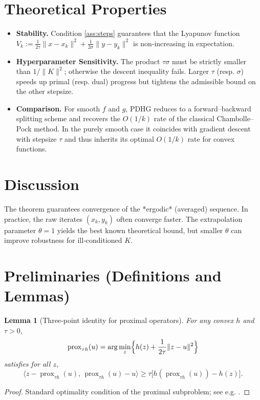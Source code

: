 \documentclass{article}
\newtheorem{lemma}{Lemma}
\begin{document}
\section*{Theoretical Properties}
\begin{itemize}
  \item \textbf{Stability.} Condition \eqref{ass:steps} guarantees that the Lyapunov function  
  $V_{k}:=\frac{1}{2\tau}\|x-x_{k}\|^{2}+\frac{1}{2\sigma}\|y-y_{k}\|^{2}$  
  is non‑increasing in expectation.
  \item \textbf{Hyperparameter Sensitivity.} The product $\tau\sigma$ must be strictly smaller than $1/\|K\|^{2}$; otherwise the descent inequality fails. Larger $\tau$ (resp. $\sigma$) speeds up primal (resp. dual) progress but tightens the admissible bound on the other stepsize.
  \item \textbf{Comparison.} For smooth $f$ and $g$, PDHG reduces to a forward–backward splitting scheme and recovers the $O(1/k)$ rate of the classical Chambolle–Pock method. In the purely smooth case it coincides with gradient descent with stepsize $\tau$ and thus inherits its optimal $O(1/k)$ rate for convex functions.
\end{itemize}

\section*{Discussion}
The theorem guarantees convergence of the *ergodic* (averaged) sequence. In practice, the raw iterates $(x_{k},y_{k})$ often converge faster. The extrapolation parameter $\theta=1$ yields the best known theoretical bound, but smaller $\theta$ can improve robustness for ill‑conditioned $K$.

\section*{Preliminaries (Definitions and Lemmas)}
\begin{lemma}[Three‑point identity for proximal operators]\label{lem:prox}
For any convex $h$ and $\tau>0$,
\[
\operatorname{prox}_{\tau h}(u)=\arg\min_{z}\Bigl\{h(z)+\frac{1}{2\tau}\|z-u\|^{2}\Bigr\}
\]
satisfies for all $z$,
\[
\langle z-\operatorname{prox}_{\tau h}(u),\, \operatorname{prox}_{\tau h}(u)-u\rangle
\ge\tau\bigl[h(\operatorname{prox}_{\tau h}(u))-h(z)\bigr].
\tag{5}
\]
\end{lemma}
\begin{proof}
Standard optimality condition of the proximal subproblem; see e.g. \cite{parikh2014prox}.
\end{proof}
\end{document}
